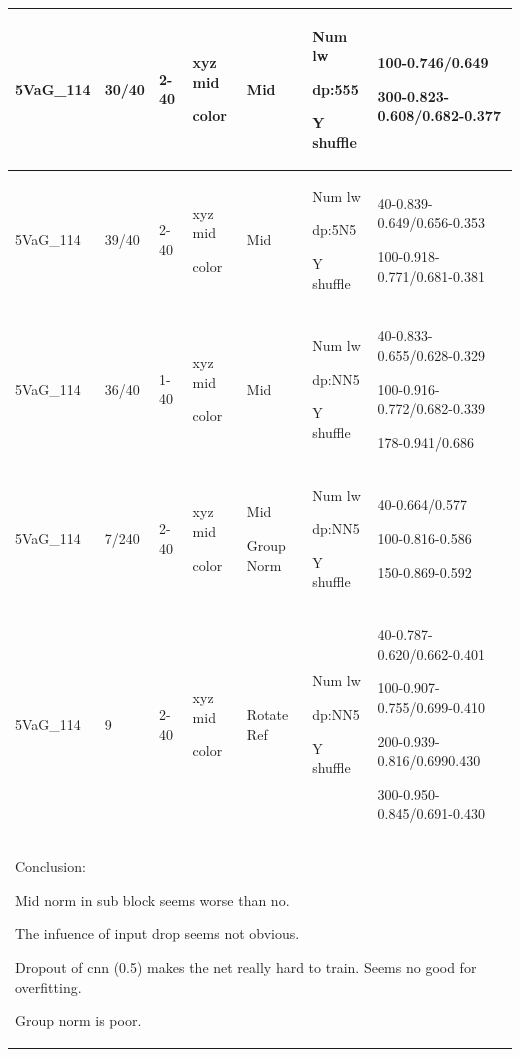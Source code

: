 \documentclass[,table,dvipsnames]{article}
\begin{document}
\begin{tabular}{|p{1.5cm}|p{1.5cm}|p{1cm}|p{1.5cm}|p{1.5cm}|p{1.5cm}|p{5cm}| }
	5VaG\_114 & 30/40 &2-40 & xyz mid\par color & Mid & Num lw\par dp:555\par Y shuffle &100-0.746/0.649\par 300-0.823-0.608/0.682-0.377\\
	\hline
	5VaG\_114 & 39/40 &2-40 & xyz mid\par color & Mid & Num lw\par dp:5N5\par Y shuffle &40-0.839-0.649/0.656-0.353\par 100-0.918-0.771/0.681-0.381\par\\
	\hline
	5VaG\_114 & 36/40 &1-40 & xyz mid\par color & Mid & Num lw\par dp:NN5\par Y shuffle &40-0.833-0.655/0.628-0.329\par 100-0.916-0.772/0.682-0.339\par 178-0.941/0.686\\
	\hline
	5VaG\_114 & 7/240 &2-40 & xyz mid\par color & Mid \par Group Norm& Num lw\par dp:NN5\par Y shuffle &40-0.664/0.577\par 100-0.816-0.586\par 150-0.869-0.592\\
	\hline\hline
	5VaG\_114 & 9 &2-40 & xyz mid\par color & Rotate Ref & Num lw\par dp:NN5\par Y shuffle &40-0.787-0.620/0.662-0.401\par 100-0.907-0.755/0.699-0.410\par 200-0.939-0.816/0.6990.430\par 300-0.950-0.845/0.691-0.430\\
	\hline
	
	\multicolumn{7}{|p{14cm}|}{ Conclusion:\par	
		Mid norm in sub block seems worse than no. \par 
		The infuence of input drop seems not obvious. \par 
		Dropout of cnn (0.5) makes the net really hard to train. Seems no good for overfitting.\par 
		Group norm is poor.   } \\
	\hline
\end{tabular}	
\end{document}
